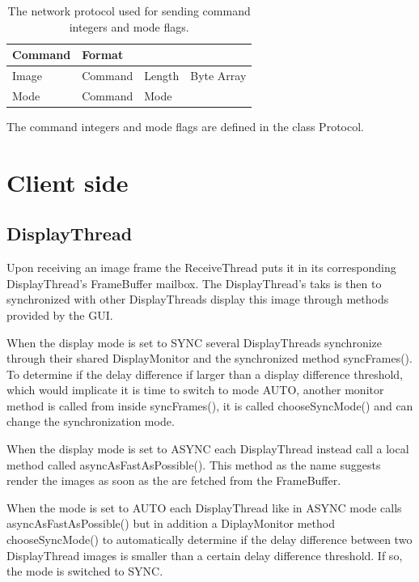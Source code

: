 \documentclass[8pt,titlepage]{article}
\begin{document}
\begin{table}[h!]
    
    	\begin{tabular}{|l|lll|}

	\hline   \textbf{Command} & \textbf{Format} & & \\ \hline                
     
               
       \hline Image   &   Command & Length & Byte Array \\ \hline
       
     
        \hline Mode    & Command & Mode & \\ \hline
    \end{tabular}

 
   \caption{The network protocol used for sending command integers and mode flags.}

    \label{tableprot}
\end{table}


The command integers and mode flags are defined in the class Protocol.


\section{Client side}

\subsection{DisplayThread}
Upon receiving an image frame the ReceiveThread puts it in its corresponding DisplayThread’s FrameBuffer mailbox. The DisplayThread’s taks is then to synchronized with other DisplayThreads display this image through methods provided by the GUI.

When the display mode is set to SYNC several DisplayThreads synchronize through their shared DisplayMonitor and the synchronized method syncFrames(). To determine if the delay difference if larger than a display difference threshold, which would implicate it is time to switch to mode AUTO, another monitor method is called from inside syncFrames(), it is called chooseSyncMode() and can change the synchronization mode.

When the display mode is set to ASYNC each DisplayThread instead call a local method called
asyncAsFastAsPossible(). This method as the name suggests render the images as soon as the are fetched from the FrameBuffer.

When the mode is set to AUTO each DisplayThread like in ASYNC mode calls asyncAsFastAsPossible() but in addition a DiplayMonitor method chooseSyncMode() to automatically determine if the delay difference between two DisplayThread images is smaller than a certain delay difference threshold. If so, the mode is switched to SYNC.
\end{document}
